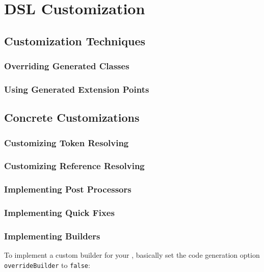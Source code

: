 \chapter{DSL Customization}

\section{Customization Techniques}

\subsection{Overriding Generated Classes}

\subsection{Using Generated Extension Points}



\section{Concrete Customizations}

\subsection{Customizing Token Resolving}
\label{sec:cust_token_resolving}

\subsection{Customizing Reference Resolving}
\label{sec:cust_reference_resolving}

\subsection{Implementing Post Processors}

\subsection{Implementing Quick Fixes}

\subsection{Implementing Builders}

To implement a custom builder for your \DSL, basically set the code generation
option \texttt{overrideBuilder} to \texttt{false}:

